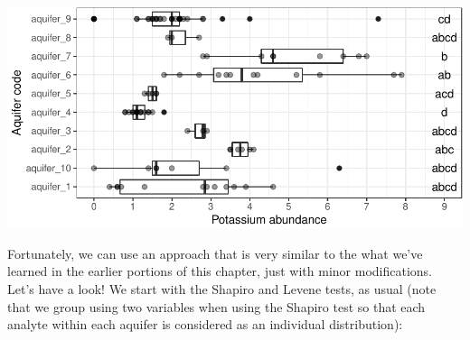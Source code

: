 \documentclass[
]{krantz}
\begin{document}
\begin{center}\includegraphics{index_files/figure-latex/unnamed-chunk-153-1} \end{center}

Fortunately, we can use an approach that is very similar to the what we've learned in the earlier portions of this chapter, just with minor modifications. Let's have a look! We start with the Shapiro and Levene tests, as usual (note that we group using two variables when using the Shapiro test so that each analyte within each aquifer is considered as an individual distribution):
\end{document}

